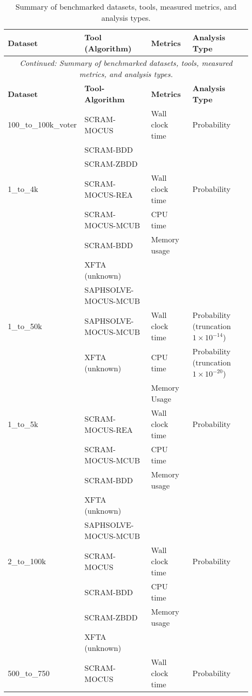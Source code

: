 \begin{longtable}{llll}
\caption{Summary of benchmarked datasets, tools, measured metrics, and analysis types.}
\label{tab:what_was_benchmarked}\\
\toprule
\textbf{Dataset} & \textbf{Tool (Algorithm)} & \textbf{Metrics} & \textbf{Analysis Type} \\
\midrule
\endfirsthead
\multicolumn{4}{c}{\textit{Continued: Summary of benchmarked datasets, tools, measured metrics, and analysis types.}}\\
\toprule
\textbf{Dataset} & \textbf{Tool-Algorithm} & \textbf{Metrics} & \textbf{Analysis Type} \\
\midrule
\endhead
%
\bottomrule
\endfoot
%
\endlastfoot

100\_to\_100k\_voter
    & SCRAM-MOCUS & Wall clock time & Probability \\
    & SCRAM-BDD & & \\
    & SCRAM-ZBDD & & \\
\midrule
1\_to\_4k
    & SCRAM-MOCUS-REA & Wall clock time & Probability \\
    & SCRAM-MOCUS-MCUB & CPU time  &  \\
    & SCRAM-BDD &  Memory usage &  \\
    & XFTA (unknown) &  &  \\
    & SAPHSOLVE-MOCUS-MCUB &  &  \\
\midrule
1\_to\_50k
    & SAPHSOLVE-MOCUS-MCUB & Wall clock time & Probability (truncation $1 \times 10^{-14}$) \\
    & XFTA (unknown) &  CPU time &  Probability (truncation $1 \times 10^{-20}$) \\
    &  & Memory Usage & \\
\midrule
1\_to\_5k
    & SCRAM-MOCUS-REA & Wall clock time & Probability \\
    & SCRAM-MOCUS-MCUB & CPU time &  \\
    & SCRAM-BDD & Memory usage &  \\
    & XFTA (unknown) &  &  \\
    & SAPHSOLVE-MOCUS-MCUB &  &  \\
\midrule
2\_to\_100k
    & SCRAM-MOCUS & Wall clock time & Probability \\
    & SCRAM-BDD & CPU time &  \\
    & SCRAM-ZBDD & Memory usage &  \\
    & XFTA (unknown) &  &  \\
\midrule
500\_to\_750
    & SCRAM-MOCUS & Wall clock time & Probability \\

\end{longtable}
